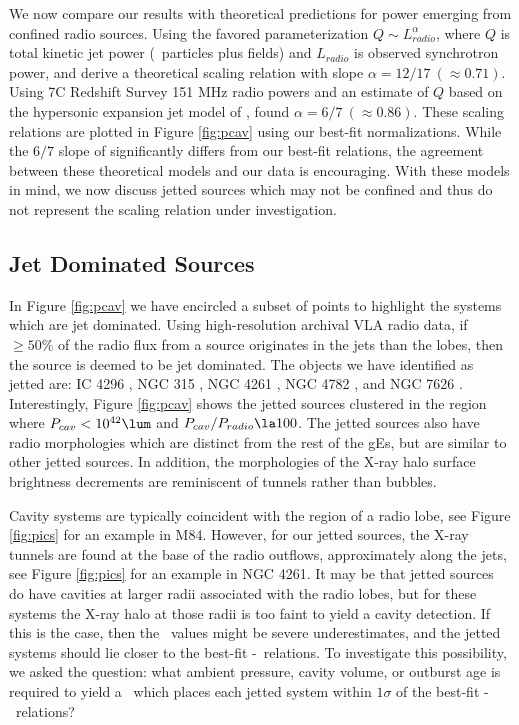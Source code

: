 \documentclass{emulateapj}
\begin{document}
We now compare our results with theoretical predictions for power
emerging from confined radio sources. Using the favored
parameterization $Q \sim L_{radio}^{\alpha}$, where $Q$ is total
kinetic jet power (\eg\ particles plus fields) and $L_{radio}$ is
observed synchrotron power, \citet{1979ApJ...232...34B} and
\citet{1995A&A...293..665F} derive a theoretical scaling relation with
slope $\alpha = 12/17~(\approx 0.71)$. Using 7C Redshift Survey 151
MHz radio powers and an estimate of $Q$ based on the hypersonic
expansion jet model of \citet{1991MNRAS.250..581F},
\citet{1999MNRAS.309.1017W} found $\alpha = 6/7~(\approx 0.86)$. These
scaling relations are plotted in Figure \ref{fig:pcav} using our
best-fit normalizations. While the $6/7$ slope of
\citet{1999MNRAS.309.1017W} significantly differs from our best-fit
relations, the agreement between these theoretical models and our data
is encouraging. With these models in mind, we now discuss jetted
sources which may not be confined and thus do not represent the
scaling relation under investigation.

\subsection{Jet Dominated Sources}
\label{sec:jet}

In Figure \ref{fig:pcav} we have encircled a subset of points to
highlight the systems which are jet dominated. Using high-resolution
archival VLA radio data, if $\ge 50\%$ of the radio flux from a source
originates in the jets than the lobes, then the source is deemed to be
jet dominated. The objects we have identified as jetted are: IC 4296
\citep{2003ApJ...585..677P}, NGC 315 \citep{1979ApJ...228L...9B,
  1981A&A....95..250W}, NGC 4261 \citep{1997ApJ...484..186J,
  2000ApJ...534..165J}, NGC 4782 \citep{2007ApJ...664..804M}, and NGC
7626 \citep{1985ApJ...291...32B}. Interestingly, Figure \ref{fig:pcav}
shows the jetted sources clustered in the region where $\pcav <
10^{42} \lum$ and $\pcav/\prad \la 100$. The jetted sources also have
radio morphologies which are distinct from the rest of the gEs, but
are similar to other jetted sources. In addition, the morphologies of
the X-ray halo surface brightness decrements are reminiscent of
tunnels rather than bubbles.

Cavity systems are typically coincident with the region of a radio
lobe, see Figure \ref{fig:pics} for an example in M84. However, for
our jetted sources, the X-ray tunnels are found at the base of the
radio outflows, approximately along the jets, see Figure
\ref{fig:pics} for an example in NGC 4261. It may be that jetted
sources do have cavities at larger radii associated with the radio
lobes, but for these systems the X-ray halo at those radii is too
faint to yield a cavity detection. If this is the case, then the
\pcav\ values might be severe underestimates, and the jetted systems
should lie closer to the best-fit \pcav-\prad\ relations. To
investigate this possibility, we asked the question: what ambient
pressure, cavity volume, or outburst age is required to yield a
\pcav\ which places each jetted system within $1\sigma$ of the
best-fit \pcav-\prad\ relations?
\end{document}
